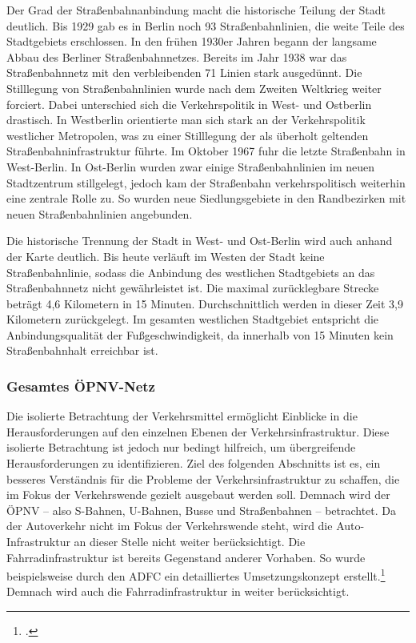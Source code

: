 Der Grad der Straßenbahnanbindung macht die historische Teilung der Stadt deutlich. Bis 1929 gab es in Berlin noch 93 Straßenbahnlinien, die weite Teile des Stadtgebiets erschlossen. In den frühen 1930er Jahren begann der langsame Abbau des Berliner Straßenbahnnetzes. Bereits im Jahr 1938 war das Straßenbahnnetz mit den verbleibenden 71 Linien stark ausgedünnt. Die Stilllegung von Straßenbahnlinien wurde nach dem Zweiten Weltkrieg weiter forciert. Dabei unterschied sich die Verkehrspolitik in West- und Ostberlin drastisch. In Westberlin orientierte man sich stark an der Verkehrspolitik westlicher Metropolen, was zu einer Stilllegung der als überholt geltenden Straßenbahninfrastruktur führte. Im Oktober 1967 fuhr die letzte Straßenbahn in West-Berlin. In Ost-Berlin wurden zwar einige Straßenbahnlinien im neuen Stadtzentrum stillgelegt, jedoch kam der Straßenbahn verkehrspolitisch weiterhin eine zentrale Rolle zu. So wurden neue Siedlungsgebiete in den Randbezirken mit neuen Straßenbahnlinien angebunden.


Die historische Trennung der Stadt in West- und Ost-Berlin wird auch anhand der Karte deutlich. Bis heute verläuft im Westen der Stadt keine Straßenbahnlinie, sodass die Anbindung des westlichen Stadtgebiets an das Straßenbahnnetz nicht gewährleistet ist. Die maximal zurücklegbare Strecke beträgt 4,6 Kilometern in 15 Minuten. Durchschnittlich werden in dieser Zeit 3,9 Kilometern zurückgelegt. Im gesamten westlichen Stadtgebiet entspricht die Anbindungsqualität der Fußgeschwindigkeit, da innerhalb von 15 Minuten kein Straßenbahnhalt erreichbar ist.

\subsubsection{Gesamtes ÖPNV-Netz}

Die isolierte Betrachtung der Verkehrsmittel ermöglicht Einblicke in die Herausforderungen auf den einzelnen Ebenen der Verkehrsinfrastruktur. Diese isolierte Betrachtung ist jedoch nur bedingt hilfreich, um übergreifende Herausforderungen zu identifizieren. Ziel des folgenden Abschnitts ist es, ein besseres Verständnis für die Probleme der Verkehrsinfrastruktur zu schaffen, die im Fokus der Verkehrswende gezielt ausgebaut werden soll. Demnach wird der \ac{ÖPNV} – also S-Bahnen, U-Bahnen, Busse und Straßenbahnen – betrachtet. Da der Autoverkehr nicht im Fokus der Verkehrswende steht, wird die Auto-Infrastruktur an dieser Stelle nicht weiter berücksichtigt. Die Fahrradinfrastruktur ist bereits Gegenstand anderer Vorhaben. So wurde beispielsweise durch den \ac{ADFC} ein detailliertes Umsetzungskonzept erstellt.\footcite{ADFC} Demnach wird auch die Fahrradinfrastruktur in weiter berücksichtigt.

